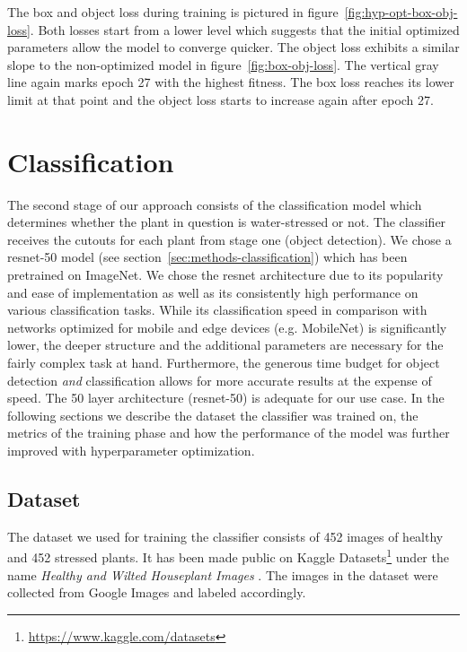\documentclass[draft,final]{vutinfth} %
\begin{document}
The box and object loss during training is pictured in
figure~\ref{fig:hyp-opt-box-obj-loss}. Both losses start from a lower
level which suggests that the initial optimized parameters allow the
model to converge quicker. The object loss exhibits a similar slope to
the non-optimized model in figure~\ref{fig:box-obj-loss}. The vertical
gray line again marks epoch \num{27} with the highest fitness. The box
loss reaches its lower limit at that point and the object loss starts
to increase again after epoch \num{27}.

\section{Classification}
\label{sec:development-classification}

The second stage of our approach consists of the classification model
which determines whether the plant in question is water-stressed or
not. The classifier receives the cutouts for each plant from stage one
(object detection). We chose a \gls{resnet}-50 model (see
section~\ref{sec:methods-classification}) which has been pretrained on
ImageNet. We chose the \gls{resnet} architecture due to its popularity
and ease of implementation as well as its consistently high
performance on various classification tasks. While its classification
speed in comparison with networks optimized for mobile and edge
devices (e.g. MobileNet) is significantly lower, the deeper structure
and the additional parameters are necessary for the fairly complex
task at hand. Furthermore, the generous time budget for object
detection \emph{and} classification allows for more accurate results
at the expense of speed. The \num{50} layer architecture
(\gls{resnet}-50) is adequate for our use case. In the following
sections we describe the dataset the classifier was trained on, the
metrics of the training phase and how the performance of the model was
further improved with hyperparameter optimization.

\subsection{Dataset}
\label{ssec:class-train-dataset}

The dataset we used for training the classifier consists of \num{452}
images of healthy and \num{452} stressed plants. It has been made
public on Kaggle
Datasets\footnote{\url{https://www.kaggle.com/datasets}} under the
name \emph{Healthy and Wilted Houseplant Images} \cite{chan2020}. The
images in the dataset were collected from Google Images and labeled
accordingly.
\end{document}

